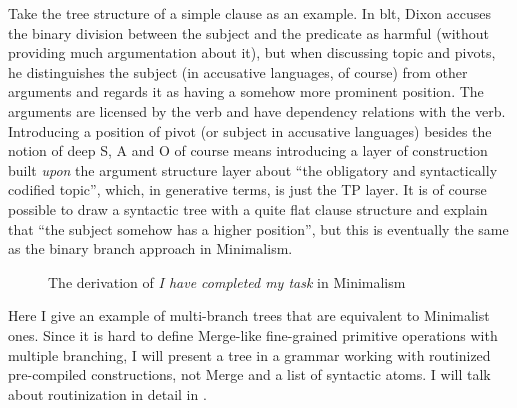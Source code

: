 \documentclass[../main.tex]{subfiles}
\begin{document}
Take the tree structure of a simple clause as an example. 
In \ac{blt}, Dixon accuses the binary division between 
the subject and the predicate as harmful (without providing much argumentation about it), but when discussing 
topic and pivots, he distinguishes the subject (in accusative languages, of course) from other arguments and regards it as having a somehow more 
prominent position. The arguments are licensed by the verb and have dependency relations with the verb. 
Introducing a position of pivot (or subject in accusative languages) besides the notion of deep S, A and O 
of course means introducing a layer of construction built \emph{upon} the argument structure layer
about ``the obligatory and syntactically codified topic'', 
which, in generative terms, is just the TP layer. It is of course possible to draw a syntactic tree 
with a quite flat clause structure and explain that ``the subject somehow has a higher position'', 
but this is eventually the same as the binary branch approach in Minimalism.

\begin{figure}
    \centering
    
    \caption{The derivation of \emph{I have completed my task} in Minimalism}
    \label{fig:complete-my-task-minimalism}
\end{figure}

Here I give an example of multi-branch trees that are equivalent to Minimalist ones.
Since it is hard to define Merge-like fine-grained primitive operations with multiple branching,
I will present a tree in a grammar working with routinized pre-compiled constructions, 
not Merge and a list of syntactic atoms. I will talk about routinization in detail in . 
\end{document}
